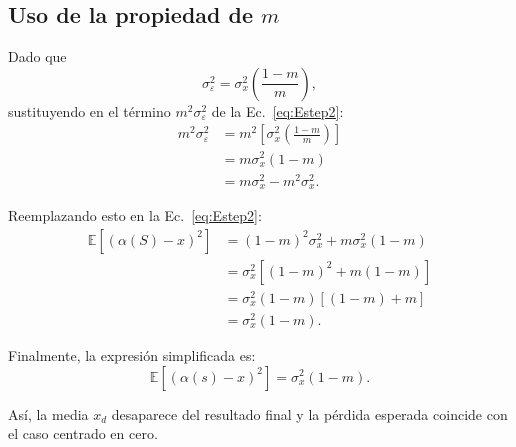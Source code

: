 \subsection{Uso de la propiedad de $m$}

Dado que
\begin{equation}
\sigma_{\varepsilon}^2 = \sigma_x^2 \left( \frac{1 - m}{m} \right),
\label{eq:propiedadm}
\end{equation}
sustituyendo en el término $m^2 \sigma_{\varepsilon}^2$ de la Ec.~\eqref{eq:Estep2}:
\begin{align*}
m^2 \sigma_{\varepsilon}^2 
&= m^2 \left[ \sigma_x^2 \left( \frac{1 - m}{m} \right) \right] \\
&= m \sigma_x^2 (1 - m) \\
&= m \sigma_x^2 - m^2 \sigma_x^2.
\end{align*}

Reemplazando esto en la Ec.~\eqref{eq:Estep2}:
\begin{align*}
\mathbb{E}[(\alpha(S) - x)^2] 
&= (1 - m)^2 \sigma_x^2 + m \sigma_x^2 (1 - m) \\
&= \sigma_x^2 \left[ (1 - m)^2 + m(1 - m) \right] \\
&= \sigma_x^2 (1 - m) [(1 - m) + m] \\
&= \sigma_x^2 (1 - m).
\end{align*}

Finalmente, la expresión simplificada es:
\begin{equation}
\mathbb{E}[(\alpha(s) - x)^2] = \sigma_x^2 (1 - m).
\label{eq:final}
\end{equation}

Así, la media $x_d$ desaparece del resultado final y la pérdida esperada coincide con el caso centrado en cero.





